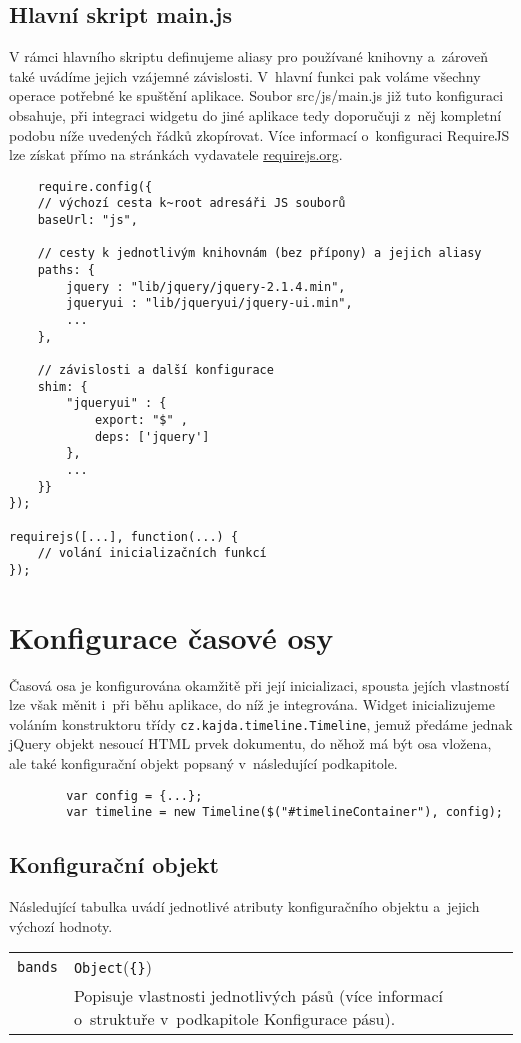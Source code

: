	\subsection*{Hlavní skript {\sf main.js}}
	V rámci hlavního skriptu definujeme aliasy pro používané knihovny a~zároveň také uvádíme jejich vzájemné závislosti. V~hlavní funkci pak voláme všechny operace potřebné ke spuštění aplikace. Soubor {\sf src/js/main.js} již tuto konfiguraci obsahuje, při integraci widgetu do jiné aplikace tedy doporučuji z~něj kompletní podobu níže uvedených řádků zkopírovat. Více informací o~konfiguraci {\sf RequireJS} lze získat přímo na stránkách vydavatele \url{requirejs.org}.
	{\small\begin{verbatim}
	require.config({
    // výchozí cesta k~root adresáři JS souborů
    baseUrl: "js",
	
    // cesty k jednotlivým knihovnám (bez přípony) a jejich aliasy
    paths: {
        jquery : "lib/jquery/jquery-2.1.4.min",
        jqueryui : "lib/jqueryui/jquery-ui.min",
        ...
    },
	
    // závislosti a další konfigurace
    shim: {
        "jqueryui" : {
            export: "$" ,
            deps: ['jquery']
        },
        ...
    }}
});

requirejs([...], function(...) {
    // volání inicializačních funkcí 
});
\end{verbatim}

\section*{Konfigurace časové osy}
Časová osa je konfigurována okamžitě při její inicializaci, spousta jejích vlastností lze však měnit i~při běhu aplikace, do níž je integrována.
	Widget inicializujeme voláním konstruktoru třídy {\tt cz.kajda.timeline.Timeline}, jemuž předáme jednak {\sf jQuery} objekt nesoucí HTML prvek dokumentu, do něhož má být osa vložena, ale také konfigurační objekt popsaný v~následující podkapitole.
	{\small\begin{verbatim}
		var config = {...};
		var timeline = new Timeline($("#timelineContainer"), config);
	\end{verbatim}}
	\pagebreak
	\subsection*{Konfigurační objekt}
	Následující tabulka uvádí jednotlivé atributy konfiguračního objektu a~jejich výchozí hodnoty.
	\begin{longtable}{|p{}p{}|}
		\hline
		{\tt bands} & {\tt Object}\hfill({\tt \{\}})\\
		& Popisuje vlastnosti jednotlivých pásů (více informací o~struktuře v~podkapitole Konfigurace pásu).\\
		

\end{longtable}}

